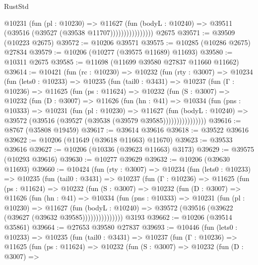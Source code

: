 \begin{lexlean}{RustStd}
\begin{coremodule}
                        @10231
                          (fun (pl : @10230) =>
                          @11627
                            (fun (bodyL : @10240) =>
                            @39511 (@39516 (@39527 (@39538 @11707))))))))))))))))
    @2675
@39571 := @39509 (@10223 @2675)
@39572 := @10206 @39571
@39575 := @10285 (@10286 @2675) @27834
@39579 := @10206 (@10277 (@39575 @11689) @11693)
@39580 := @10311 @2675
@39585 := @11698 (@11699 @39580 @27837 @11660 @11662)
@39614 := @10421
    (fun (rc : @10230) =>
    @10232
      (fun (rty : @3007) =>
      @10234
        (fun (lets0 : @10233) =>
        @10235
          (fun (tail0 : @3431) =>
          @10237
            (fun (Γ : @10236) =>
            @11625
              (fun (ps : @11624) =>
              @10232
                (fun (S : @3007) =>
                @10232
                  (fun (D : @3007) =>
                  @11626
                    (fun (hn : @41) =>
                    @10334
                      (fun (pns : @10333) =>
                      @10231
                        (fun (pl : @10230) =>
                        @11627
                          (fun (bodyL : @10240) =>
                          @39572 (@39516 (@39527 (@39538 (@39579 @39585))))))))))))))))
@39616 := @8767 (@35808 @19459)
@39617 := @39614 @39616
@39618 := @39522 @39616
@39622 := @10206 (@11649 (@39618 @11663) @11670)
@39623 := @39533 @39616
@39627 := @10206 (@10336 (@39623 @11663) @3173)
@39629 := @39575 (@10293 @39616)
@39630 := @10277 @39629
@39632 := @10206 (@39630 @11693)
@39660 := @10424
    (fun (rty : @3007) =>
    @10234
      (fun (lets0 : @10233) =>
      @10235
        (fun (tail0 : @3431) =>
        @10237
          (fun (Γ : @10236) =>
          @11625
            (fun (ps : @11624) =>
            @10232
              (fun (S : @3007) =>
              @10232
                (fun (D : @3007) =>
                @11626
                  (fun (hn : @41) =>
                  @10334
                    (fun (pns : @10333) =>
                    @10231
                      (fun (pl : @10230) =>
                      @11627
                        (fun (bodyL : @10240) =>
                        @39572 (@39516 (@39622 (@39627 (@39632 @39585)))))))))))))))
    @3193
@39662 := @10206 (@39514 @35861)
@39664 := @27653 @39580 @27837
@39693 := @10446
    (fun (lets0 : @10233) =>
    @10235
      (fun (tail0 : @3431) =>
      @10237
        (fun (Γ : @10236) =>
        @11625
          (fun (ps : @11624) =>
          @10232
            (fun (S : @3007) =>
            @10232
              (fun (D : @3007) =>

\end{coremodule}
\end{lexlean}

